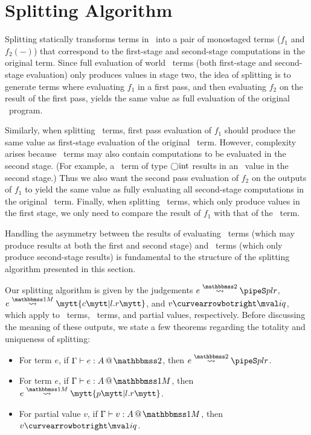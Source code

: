 
\section{Splitting Algorithm}
\label{sec:splitting}

%

\begin{abstrsyn}

Splitting statically transforms terms in \lang\ into a pair of
monostaged terms ($f_1$ and $f_2(-)$) that correspond to the first-stage 
and second-stage computations in the original term. Since full
evaluation of world \bbtwo\ terms (both first-stage and second-stage
evaluation) only produces values in stage two, the idea of splitting
is to generate terms where evaluating $f_1$ in a first pass, and then
evaluating $f_2$ on the result of the first pass, yields the same
value as full evaluation of the original \lang\ program.

Similarly, when splitting \bbonem\ terms, first pass evaluation of
$f_1$ should produce the same value as first-stage evaluation of the
original \lang\ term.  However, complexity arises because
\bbonem\ terms may also contain computations to be evaluated in the
second stage. (For example, a \bbonem\ term of type $\bigcirc {\rm int}$
results in an \rmint\ value in the second stage.) Thus we also want
the second pass evaluation of $f_2$ on the outputs of $f_1$ to yield
the same value as fully evaluating all second-stage computations in
the original \bbonem\ term. Finally, when splitting \bbonep\ terms,
which only produce values in the first stage, we only need to compare
the result of $f_1$ with that of the \lang\ term.

Handling the asymmetry between the results of evaluating
\bbonem\ terms (which may produce results at both the first and second
stage) and \bbtwo\ terms (which only produce second-stage results) is
fundamental to the structure of the splitting algorithm presented in
this section.

Our splitting algorithm is given by the judgements $\splittwo e A p l r$, $\splitone e A c {l.r}$, and $v \vsplito \mval i q$,
which apply to \bbtwo\ terms, \bbonem\ terms, and partial values, respectively.
Before discussing the meaning of these outputs, 
we state a few theorems regarding the totality and uniqueness of splitting:

\begin{theorem} \leavevmode
\label{thm:total} 
\begin{itemize} 
\item For term $e$, if $\typestwo e A$, then $\splittwo e A p l r$. 
\item For term $e$, if $\typesone e A$, then $\splitone e A p {l.r}$.
\item For partial value $v$, if $\typesone v A$, then $v \vsplito \mval i q$.
\end{itemize}
\end{theorem}


\end{abstrsyn}
